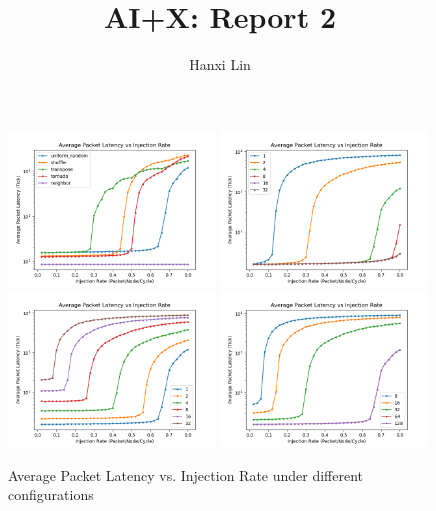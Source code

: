 \documentclass{article}
\title{\bf\huge AI+X: Report 2}
\author{Hanxi Lin}
\begin{document}
\maketitle

\begin{figure}[h]
    \centering
    \includegraphics[width=0.49\textwidth]{lab2-SYNTHETIC_TRAFFIC.png}
    \includegraphics[width=0.49\textwidth]{lab2-VCS_PER_VNET.png}
    \includegraphics[width=0.49\textwidth]{lab2-ROUTER_LATENCY.png}
    \includegraphics[width=0.49\textwidth]{lab2-LINK_WIDTH_BITS.png}
    \caption{Average Packet Latency vs. Injection Rate under different configurations}
\end{figure}
\end{document}
